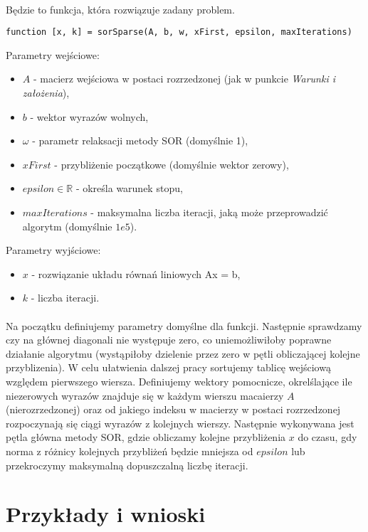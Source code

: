 \documentclass{article}
\begin{document}
\paragraph{}
Będzie to funkcja, która rozwiązuje zadany problem.
\begin{lstlisting}[style=Matlab-editor]
function [x, k] = sorSparse(A, b, w, xFirst, epsilon, maxIterations)
\end{lstlisting}
\vspace{4pt}
Parametry wejściowe:
\begin{itemize}
\item $A$ - macierz wejściowa w postaci rozrzedzonej (jak w punkcie \textit{Warunki i założenia}),
\item $b$ - wektor wyrazów wolnych,
\item $\omega$ - parametr relaksacji metody SOR (domyślnie 1),
\item $xFirst$ - przybliżenie początkowe (domyślnie wektor zerowy),
\item $epsilon\in \mathbb{R}$ - określa warunek stopu,
\item $maxIterations$ - maksymalna liczba iteracji, jaką może przeprowadzić algorytm (domyślnie $1e5$).
\end{itemize}
Parametry wyjściowe:
\begin{itemize}
\item$x$ - rozwiązanie układu równań liniowych Ax = b,
\item$ k$ - liczba iteracji.
\end{itemize}
\paragraph{} Na początku definiujemy parametry domyślne dla funkcji. Następnie sprawdzamy czy na głównej diagonali nie występuje zero, co uniemożliwiłoby poprawne działanie algorytmu (wystąpiłoby dzielenie przez zero w pętli obliczającej kolejne przyblizenia). W celu ułatwienia dalszej pracy sortujemy tablicę wejściową względem pierwszego wiersza. Definiujemy wektory pomocnicze, okrelślające ile niezerowych wyrazów znajduje się w każdym wierszu macaierzy $A$ (nierozrzedzonej) oraz od jakiego indeksu w macierzy w postaci rozrzedzonej rozpoczynają się ciągi wyrazów z kolejnych wierszy. Następnie wykonywana jest pętla główna metody SOR, gdzie obliczamy kolejne przybliżenia $x$ do czasu, gdy norma z różnicy kolejnych przybliżeń będzie mniejsza od $epsilon$ lub przekroczymy maksymalną dopuszczalną liczbę iteracji.
\section{Przykłady i wnioski}
\end{document}
